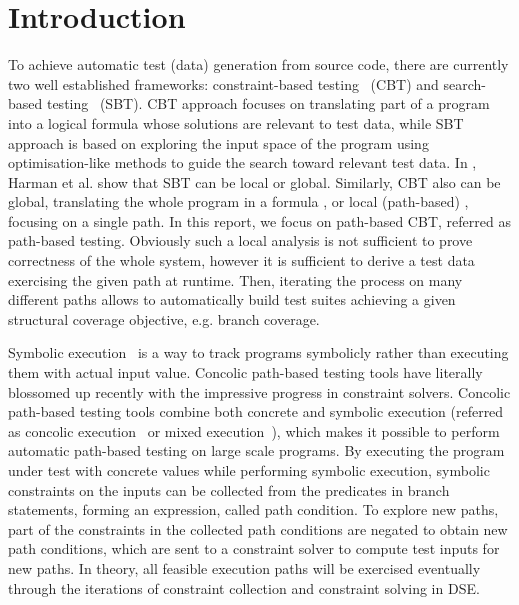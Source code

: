 \section{Introduction} 
To achieve automatic test (data) generation from source code, there are currently two well established frameworks: constraint-based testing~\cite{constraint,inka,dart,cute,onthefly}  (CBT) and search-based testing~\cite{iterative,una,empirical,auto,procedure} (SBT). CBT approach focuses on translating part of a program into a logical formula whose solutions are relevant to test data, while SBT approach is based on exploring the input space of the program using optimisation-like methods to guide the search toward relevant test data. In \cite{empirical}, Harman et al. show that SBT can be local or global. Similarly, CBT also can be global, translating the whole program in a formula \cite{constraint,inka}, or local (path-based) \cite{dart,cute,onthefly}, focusing on a single path. In this report, we focus on path-based CBT, referred as path-based testing. Obviously such a local analysis is not sufficient to prove correctness of the whole system, however it is sufficient to derive a test data exercising the given path at runtime. Then, iterating the process on many different paths allows to automatically build test suites achieving a given structural coverage objective, e.g. branch coverage.

Symbolic execution~\cite{symbolic} is a way to track programs symbolicly rather than executing them with actual input value. Concolic path-based testing tools have literally blossomed up recently \cite{extenjpf,structural,mixed,exe,fuzz,pex} with the impressive progress in constraint solvers. Concolic path-based testing tools combine both concrete and symbolic execution (referred as concolic execution~\cite{dart,cute} or mixed execution~\cite{mixed}), which makes it possible to perform automatic path-based testing on large scale programs. By executing the program under test with concrete values while performing symbolic execution, symbolic constraints on the inputs can be collected from the predicates in branch statements, forming an expression, called path condition. To explore new paths, part of the constraints in the collected path conditions are negated to obtain new path conditions, which are sent to a constraint solver to compute test inputs for new paths. In theory, all feasible execution paths will be exercised eventually through the iterations of constraint collection and constraint solving in DSE. 

